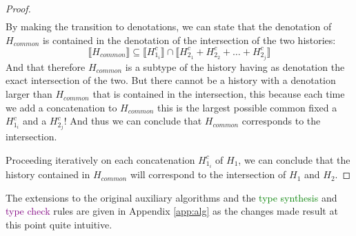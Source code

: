 \begin{proof}
\begin{equation}
\begin{gathered}
        \end{gathered}
    \end{equation}
    By making the transition to denotations, we can state that the denotation of $H_{common}$ is contained in the denotation of the intersection of the two histories:
    \begin{equation}
        \llbracket H_{common} \rrbracket \subseteq \llbracket H_{1_i}^c \rrbracket \cap \llbracket H_{2_1}^c + H_{2_2}^c + \dots + H_{2_j}^c \rrbracket
    \end{equation}
    And that therefore $H_{common}$ is a subtype of the history having as denotation the exact intersection of the two. But there cannot be a history with a denotation larger than $H_{common}$ that is contained in the intersection, this because each time we add a concatenation to $H_{common}$ this is the largest possible common fixed a $H_{1_i}^c$ and a $H_{2_j}^c$! And thus we can conclude that $H_{common}$ corresponds to the intersection.

    Proceeding iteratively on each concatenation $H_{1_i}^c$ of $H_1$, we can conclude that the history contained in $H_{common}$ will correspond to the intersection of $H_1$ and $H_2$.
\end{proof}

The extensions to the original auxiliary algorithms and the \textcolor{Green}{type synthesis} and \textcolor{purple}{type check} rules are given in Appendix \ref{app:alg} as the changes made result at this point quite intuitive.